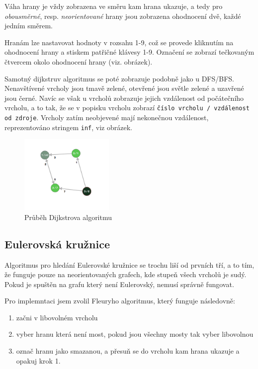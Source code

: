 \documentclass{article}
\def\code#1{\texttt{#1}}
\begin{document}
Váha hrany je vždy zobrazena ve směru kam hrana ukazuje, a tedy pro
\emph{obousměrné}, resp. \emph{neorientované} hrany jsou zobrazena ohodnocení dvě,
každé jedním směrem.

Hranám lze nastavovat hodnoty v rozsahu 1-9, což se provede kliknutím na
ohodnocení hrany a stiskem patřičné klávesy 1-9. Označení se zobrazí
tečkovaným čtvercem okolo ohodnocení hrany (viz. obrázek).

Samotný dijkstruv algoritmus se poté zobrazuje podobně jako u DFS/BFS.
Nenavštívené vrcholy jsou tmavě zelené, otevřené jsou světle zelené a
uzavřené jsou černé. Navíc se však u vrcholů zobrazuje jejich vzdálenost
od počátečního vrcholu, a to tak, že se v popisku vrcholu zobrazí \code{číslo
vrcholu / vzdálenost od zdroje}. Vrcholy zatím neobjevené mají
nekonečnou vzdálenost, reprezentováno stringem \code{inf}, viz obrázek.

\begin{figure}[!h]
  \centering
    \includegraphics[width=0.40\textwidth]{OWYHOQ7.png}
  \caption{Průběh Dijkstrova algoritmu}
\end{figure}

\pagebreak

\subsection{Eulerovská kružnice}

Algoritmus pro hledání Eulerovské kružnice se trochu liší od prvních
tří, a to tím, že funguje pouze na neorientovaných grafech, kde stupeň
všech vrcholů je sudý. Pokud je spuštěn na grafu který není Eulerovský,
nemusí správně fungovat.

Pro implemntaci jsem zvolil Fleuryho algoritmus, který funguje následovně:

\begin{enumerate}
  \item začni v libovolném vrcholu
  \item vyber hranu která není most, pokud jsou všechny mosty tak vyber libovolnou
  \item označ hranu jako smazanou, a přesuň se do vrcholu kam hrana ukazuje a opakuj krok 1.
\end{enumerate}
\end{document}
